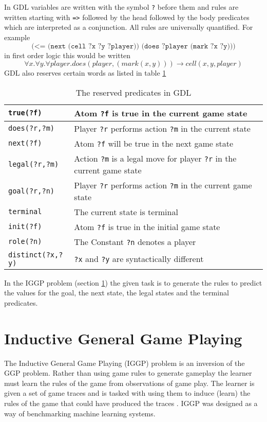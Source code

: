 In GDL variables are written with the symbol \texttt{?} before them and rules are written starting with \verb|=>| followed by the head followed by the body predicates which are interpreted as a conjunction. All rules are universally quantified. For example
\[\texttt{(<= (next (cell ?x ?y ?player)) (does ?player (mark ?x ?y)))}\]
in first order logic this would be written
\[\forall x. \forall y. \forall player. does(player,(mark(x,y))) \rightarrow cell(x,y,player)\]
GDL also reserves certain words as listed in table \ref{tab:GDL}
\begin{center}
	\begin{table}
	\begin{tabular}{| l | l |}
		\hline
		\texttt{true(?f)} & Atom \texttt{?f} is true in the current game state \\ \hline
		\texttt{does(?r,?m)} & Player \texttt{?r} performs action \texttt{?m} in the current state \\ \hline
		\texttt{next(?f)} & Atom \texttt{?f} will be true in the next game state \\ \hline
		\texttt{legal(?r,?m)} & Action \texttt{?m} is a legal move for player \texttt{?r} in the current game state\\ \hline
		\texttt{goal(?r,?n)} & Player \texttt{?r} performs action \texttt{?m} in the current game state\\ \hline
		\texttt{terminal} & The current state is terminal\\ \hline
		\texttt{init(?f)} & Atom \texttt{?f} is true in the initial game state\\ \hline
		\texttt{role(?n)} & The Constant \texttt{?n} denotes a player\\ \hline
		\texttt{distinct(?x,?y)} & \texttt{?x} and \texttt{?y} are syntactically different\\
		\hline

	\end{tabular}
	\caption{The reserved predicates in GDL}
\label{tab:GDL}
\end{table}

\end{center}


In the IGGP problem (section \ref{sec:IGGP}) the given task is to generate the rules to predict the values for the goal, the next state, the legal states and the terminal predicates.


\section{Inductive General Game Playing}\label{sec:IGGP}
The Inductive General Game Playing (IGGP) problem is an inversion of the GGP problem. Rather than using game rules to generate gameplay the learner must learn the rules of the game from observations of game play. The learner is given a set of game traces and is tasked with using them to induce (learn) the rules of the game that could have produced the traces \cite{Cropper/IGGP}. IGGP was designed as a way of benchmarking machine learning systems.

